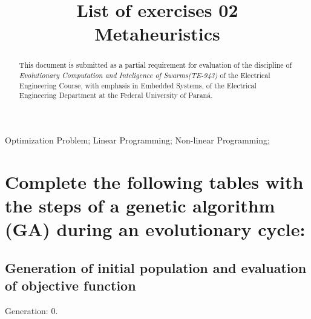 \documentclass[conference]{IEEEtran}
\begin{document}
\title{List of exercises 02\\
	Metaheuristics}
\author{
}


\maketitle

\begin{abstract}
	This document is submitted as a partial requirement for	evaluation of the discipline of \textit{Evolutionary Computation and Inteligence of Swarms(TE-943)} of the Electrical Engineering Course, with emphasis in Embedded Systems, of the Electrical Engineering Department at the Federal University of Paraná.
\end{abstract}


\begin{IEEEkeywords}Optimization Problem; Linear Programming; Non-linear Programming;\end{IEEEkeywords}

\section{Complete the following tables with the steps of a genetic algorithm (GA) during an evolutionary cycle:}

\subsection{Generation of initial population and evaluation of objective function}

Generation: $0$.
\end{document}
